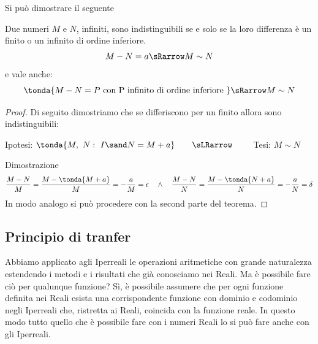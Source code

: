 Si può dimostrare il seguente
\begin{teorema}
Due numeri \(M\) e \(N\), infiniti, 
sono indistinguibili se e solo se la loro differenza è un finito o 
un infinito di ordine inferiore.
\[M-N = a \sRarrow M \sim N\] 
e vale anche:
\[\tonda{M-N = P \text{ con P infinito di ordine inferiore }} 
\sRarrow M \sim N\] 
\end{teorema}
\begin{proof}
Di seguito dimostriamo che se differiscono per un finito allora 
sono indistinguibili:
\begin{center}
Ipotesi: $\tonda{M,~N:\ I \sand N = M+a}
\qquad \sLRarrow\qquad$ 
Tesi: $M \sim N$
\end{center}
Dimostrazione
\[\frac{M-N}{M}=
\frac{M-\tonda{M +a}}{M} = 
-\frac{a}{M}= \epsilon \quad \wedge \quad 
\frac{M-N}{N}=
\frac{M-\tonda{N +a}}{N} = 
-\frac{a}{N}= \delta
\]
In modo analogo si può procedere con la second parte del teorema.
\end{proof}

\subsection{Principio di tranfer}
\label{subsec:insnum_nonarchimedei}

Abbiamo applicato agli Iperreali le operazioni aritmetiche con grande 
naturalezza estendendo i metodi e i risultati che già conosciamo nei Reali. 
Ma è possibile fare ciò per qualunque funzione? 
Sì, è possibile assumere che per ogni funzione definita nei Reali esista 
una 
corrispondente funzione con dominio e codominio negli Iperreali che, 
ristretta ai Reali, coincida con la funzione reale.
In questo modo tutto quello che è possibile fare con i numeri Reali lo si 
può 
fare anche con gli Iperreali.

